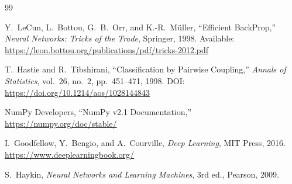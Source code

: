 \documentclass[11pt,a4paper]{article}
\begin{document}
\begin{thebibliography}{99}

Y.~LeCun, L.~Bottou, G.~B.~Orr, and K.-R.~M{\"u}ller,
``Efficient BackProp,''
\emph{Neural Networks: Tricks of the Trade}, Springer, 1998.
Available: \url{https://leon.bottou.org/publications/pdf/tricks-2012.pdf}

T.~Hastie and R.~Tibshirani,
``Classification by Pairwise Coupling,''
\emph{Annals of Statistics}, vol.~26, no.~2, pp.~451--471, 1998.
DOI: \url{https://doi.org/10.1214/aos/1028144843}

NumPy Developers,
``NumPy v2.1 Documentation,''
\url{https://numpy.org/doc/stable/}

I.~Goodfellow, Y.~Bengio, and A.~Courville,
\emph{Deep Learning}, MIT Press, 2016.
\url{https://www.deeplearningbook.org/}

S.~Haykin,
\emph{Neural Networks and Learning Machines}, 3rd ed., Pearson, 2009.

\end{thebibliography}
\end{document}
